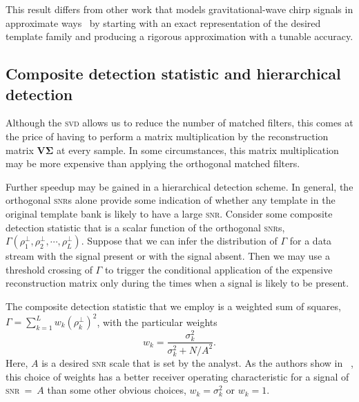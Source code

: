  This result differs from other work that models gravitational-wave chirp signals in approximate ways~\cite{Chassande-Mottin2006, Candes2008, BuonannoChenVallisneri:2003a} by starting with an exact representation of the desired template family and producing a rigorous approximation with a tunable accuracy.  

\subsection{Composite detection statistic and hierarchical detection}

 Although the \textsc{svd} allows us to reduce the number of matched filters, this comes at the price of having to perform a matrix multiplication by the reconstruction matrix $\mathbf {V \Sigma}$ at every sample.  In some circumstances, this matrix multiplication may be more expensive than applying the orthogonal matched filters.

Further speedup may be gained in a hierarchical detection scheme.  In general, the orthogonal \textsc{snr}s alone provide some indication of whether any template in the original template bank is likely to have a large \textsc{snr}.  Consider some composite detection statistic that is a scalar function of the orthogonal \textsc{snr}s, $\Gamma(\rho_1^\perp, \rho_2^\perp, \cdots, \rho_L^\perp)$.  Suppose that we can infer the distribution of $\Gamma$ for a data stream with the signal present or with the signal absent.  Then we may use a threshold crossing of $\Gamma$ to trigger the conditional application of the expensive reconstruction matrix only during the times when a signal is likely to be present.

The composite detection statistic that we employ is a weighted sum of squares, $\Gamma = \sum_{k=1}^L w_k (\rho_k^\perp) ^ 2$, with the particular weights
\begin{equation}
w_k = \frac{\sigma_k^2}{\sigma_k^2 + N / A^2}.
\end{equation}
Here, $A$ is a desired \textsc{snr} scale that is set by the analyst.  As the authors show in ~\cite{svd-compdetstat}, this choice of weights has a better receiver operating characteristic for a signal of \textsc{snr}~=~$A$ than some other obvious choices, $w_k = \sigma_k^2$ or $w_k = 1$.

